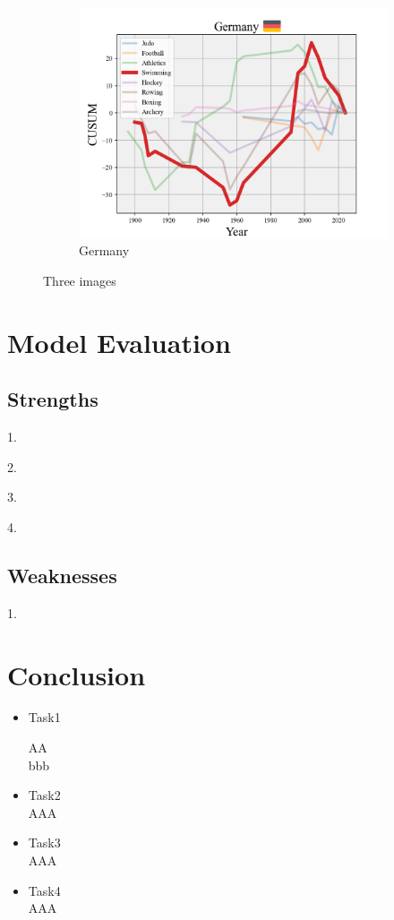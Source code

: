 \documentclass[12pt]{article}  %
\begin{document}
\begin{figure}[htbp]
\begin{subfigure}[b]{.32\textwidth}
		\includegraphics[width=\textwidth]{img/Decline3.png}
		\caption{Germany}\label{subfig:3}
	\end{subfigure}
	\caption{Three images}\label{fig:subfigures}
\end{figure}





\section{Model Evaluation}
\subsection{Strengths}
1.

2. 

3. 

4. 
\subsection{Weaknesses}
1.

 	
 	

\section{Conclusion}
\begin{itemize}
	\item Task1
	
	 \qquad AA\\
	bbb
	
	\item Task2\\
	\qquad AAA
	\item Task3\\
	\qquad AAA
	
	\item Task4\\
	\qquad AAA
	
\end{itemize}
\end{document}
